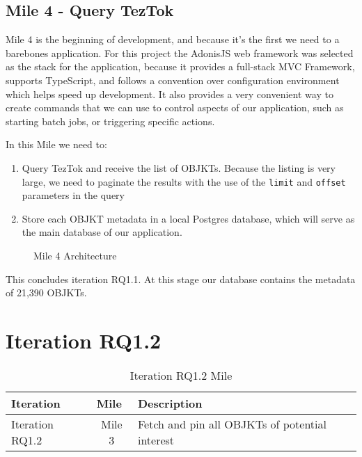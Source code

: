 \subsection {Mile 4 - Query TezTok}

Mile 4 is the beginning of development, and because it's the first we need to a barebones application. For this project the AdonisJS web framework was selected as the stack for the application, because it provides a full-stack MVC Framework, supports TypeScript, and follows a convention over configuration environment which helps speed up development. It also provides a very convenient way to create  commands that we can use to control aspects of our application, such as starting batch jobs, or triggering specific actions.

In this Mile we need to:

\begin{enumerate}
	\item Query TezTok and receive the list of OBJKTs. Because the listing is very large, we need to paginate the results with the use of the \texttt{limit} and \texttt{offset} parameters in the query
	\item Store each OBJKT metadata in a local Postgres database, which will serve as the main database of our application.
\end{enumerate}



\begin{figure}[h]
    \centering
    
    \caption[Mile 4 Architecture]{Mile 4 Architecture}
    \label{fig:mile4-arch}
\end{figure}


This concludes iteration RQ1.1. At this stage our database contains the metadata of 21,390 OBJKTs.


\section {Iteration RQ1.2}
\label{sec:rq1.2}

\begin{table}[h]
\footnotesize
\centering
\begin{tabular}{|l|c|l|}
\hline
\textbf{Iteration}        & \multicolumn{1}{l|}{\textbf{Mile}} & \textbf{Description}                                         \\ \hline
Iteration RQ1.2                  & Mile 3                              & Fetch and pin all OBJKTs of potential interest               \\ \hline
\end{tabular}
\caption{Iteration RQ1.2 Mile}
\end{table}


